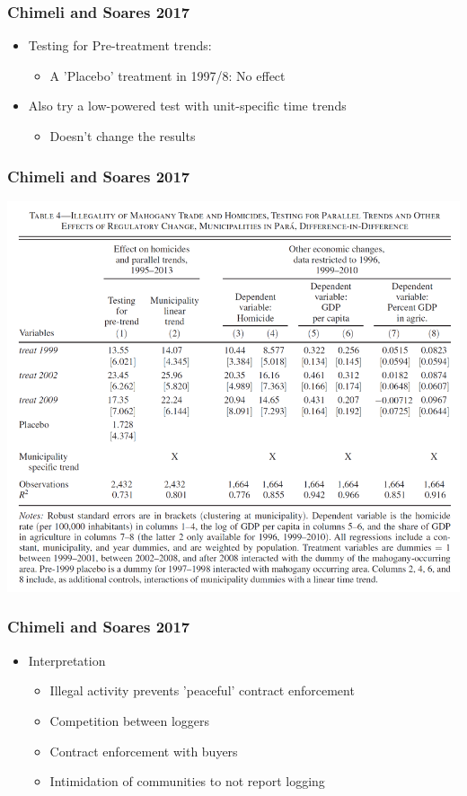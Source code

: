 \documentclass[xcolor=x11names,compress]{beamer}\usepackage[]{graphicx}\usepackage[]{color}
\renewcommand{\(}{\begin{columns}}
\renewcommand{\)}{\end{columns}}
\newcommand{\<}[1]{\begin{column}{#1}}
\renewcommand{\>}{\end{column}}
\begin{document}
\begin{frame}
\frametitle{Chimeli and Soares 2017}
\begin{itemize}
\item Testing for Pre-treatment trends:
\begin{itemize}
\pause
\item A 'Placebo' treatment in 1997/8: No effect
\pause
\end{itemize}
\item Also try a low-powered test with unit-specific time trends
\begin{itemize}
\pause
\item Doesn't change the results
\end{itemize}
\end{itemize}
\end{frame}

\begin{frame}
\frametitle{Chimeli and Soares 2017}
\begin{center}
\includegraphics[scale=0.35]{C_S_Parallel_Trends.png}
\end{center}
\end{frame}

\begin{frame}
\frametitle{Chimeli and Soares 2017}
\begin{itemize}
\item Interpretation
\pause
\begin{itemize}
\item Illegal activity prevents 'peaceful' contract enforcement
\pause
\item Competition between loggers
\pause
\item Contract enforcement with buyers
\pause
\item Intimidation of communities to not report logging
\end{itemize}
\end{itemize}
\end{frame}
\end{document}
